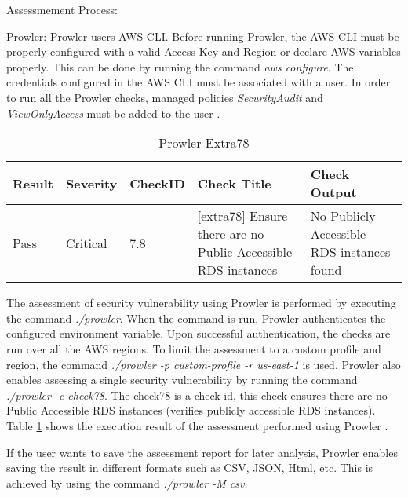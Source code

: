 \par Assessmement Process:


\par Prowler: Prowler users AWS CLI. Before running Prowler, the AWS CLI must be properly configured with a valid Access Key and Region or declare AWS variables properly.
This can be done by running the command \textit{aws configure}.
The credentials configured in the AWS CLI must be associated with a user.
In order to run all the Prowler checks, managed policies \textit{SecurityAudit} and \textit{ViewOnlyAccess} must be added to the user \cite{75}.

\begin{table}[h!]
    \begin{center}
        \caption{Prowler Extra78}
        \label{tab:prowlerextra}
        \begin{tabular}{|p{1.4cm}|p{1.7cm}|p{1.5cm}|p{4.0cm}|p{5.0cm}|}
            \hline
            \textbf{Result} & \textbf{Severity} & \textbf{CheckID} & \textbf{Check Title} & \textbf{Check Output}\\
            \hline
            Pass & Critical & 7.8 & [extra78] Ensure there are no Public Accessible RDS instances &
            No Publicly Accessible RDS instances found\\
            \hline
        \end{tabular}
    \end{center}
\end{table}

\par The assessment of security vulnerability using Prowler is performed by executing the command \textit{./prowler}.
When the command is run, Prowler authenticates the configured environment variable.
Upon successful authentication, the checks are run over all the AWS regions.
To limit the assessment to a custom profile and region, the command \textit{./prowler -p custom-profile -r us-east-1} is used.
Prowler also enables assessing a single security vulnerability by running the command \textit{./prowler -c check78}.
The check78 is a check id, this check ensures there are no Public Accessible RDS instances (verifies publicly accessible RDS instances).
Table \ref{tab:prowlerextra} shows the execution result of the assessment performed using Prowler \cite{75}.

\par If the user wants to save the assessment report for later analysis, Prowler enables saving the result in different formats such as CSV, JSON, Html, etc.
This is achieved by using the command \textit{./prowler -M csv}\cite{75}.


